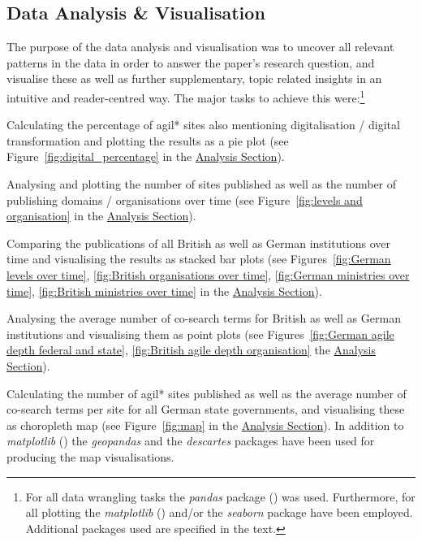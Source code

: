 \subsection{Data Analysis \& Visualisation}\label{Data Analysis and Visualisation}
The purpose of the data analysis and visualisation was to uncover all relevant patterns in the data in order to answer the paper's research question, and visualise these as well as further supplementary, topic related insights in an intuitive and reader-centred way. The major tasks to achieve this were:\footnote{For all data wrangling tasks the \textit{pandas} package (\cite{McKinney2010}) was used. Furthermore, for all plotting the \textit{matplotlib} (\cite{Hunter2007}) and/or the \textit{seaborn} package \parencite{Waskom2012} have been employed. Additional packages used are specified in the text.}
\begin{compactitem}
\item Calculating the percentage of agil* sites also mentioning digitalisation / digital transformation and plotting the results as a pie plot (see Figure~\ref{fig:digital_percentage} in the \hyperref[Analysis]{Analysis Section}).
\item Analysing and plotting the number of sites published as well as the number of publishing domains / organisations over time (see Figure~\ref{fig:levels and organisation} in the \hyperref[Analysis]{Analysis Section}). 
\item Comparing the publications of all British as well as German institutions over time and visualising the results as stacked bar plots (see Figures~\ref{fig:German levels over time}, \ref{fig:British organisations over time}, \ref{fig:German ministries over time}, \ref{fig:British ministries over time} in the \hyperref[Analysis]{Analysis Section}).
\item Analysing the average number of co-search terms for British as well as German institutions and visualising them as point plots (see Figures~\ref{fig:German agile depth federal and state}, \ref{fig:British agile depth organisation} the \hyperref[Analysis]{Analysis Section}).
\item Calculating the number of agil* sites published as well as the average number of co-search terms per site for all German state governments, and visualising these as choropleth map (see Figure~\ref{fig:map} in the \hyperref[Analysis]{Analysis Section}). In addition to \textit{matplotlib} (\cite{Hunter2007}) the \textit{geopandas} \parencite{GeoPandasDevelopers2013} and the \textit{descartes} \parencite{Gillies2020} packages have been used for producing the map visualisations.

\end{compactitem}
